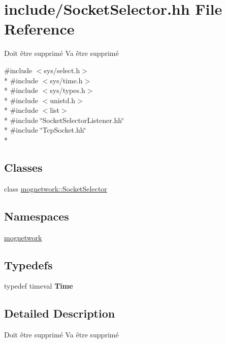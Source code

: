 \hypertarget{_socket_selector_8hh}{\section{include/\-Socket\-Selector.hh File Reference}
\label{_socket_selector_8hh}
}


Doit être supprimé  Va être supprimé  


{\ttfamily \#include $<$sys/select.\-h$>$}\\*
{\ttfamily \#include $<$sys/time.\-h$>$}\\*
{\ttfamily \#include $<$sys/types.\-h$>$}\\*
{\ttfamily \#include $<$unistd.\-h$>$}\\*
{\ttfamily \#include $<$list$>$}\\*
{\ttfamily \#include \char`\"{}Socket\-Selector\-Listener.\-hh\char`\"{}}\\*
{\ttfamily \#include \char`\"{}Tcp\-Socket.\-hh\char`\"{}}\\*
\subsection*{Classes}
\begin{DoxyCompactItemize}
\item 
class \hyperlink{classmognetwork_1_1_socket_selector}{mognetwork\-::\-Socket\-Selector}
\end{DoxyCompactItemize}
\subsection*{Namespaces}
\begin{DoxyCompactItemize}
\item 
\hyperlink{namespacemognetwork}{mognetwork}
\end{DoxyCompactItemize}
\subsection*{Typedefs}
\begin{DoxyCompactItemize}
\item 
\hypertarget{_socket_selector_8hh_af47ac292ef7224cf549b944d138ba4ae}{typedef timeval {\bfseries Time}}\label{_socket_selector_8hh_af47ac292ef7224cf549b944d138ba4ae}

\end{DoxyCompactItemize}


\subsection{Detailed Description}
Doit être supprimé  Va être supprimé 